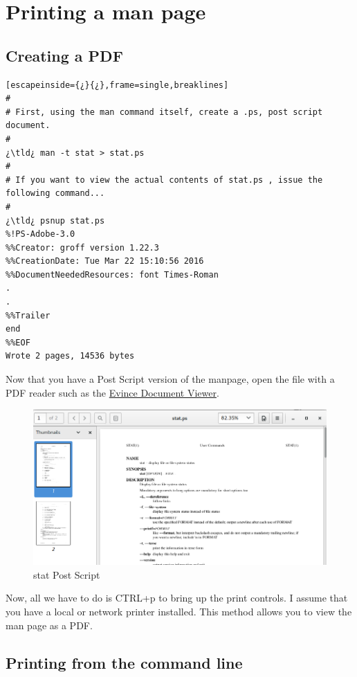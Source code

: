 \section{Printing a man page}

\subsection{Creating a PDF}

\begin{lstlisting}[escapeinside={¿}{¿},frame=single,breaklines]
#
# First, using the man command itself, create a .ps, post script document.
#
¿\tld¿ man -t stat > stat.ps
#
# If you want to view the actual contents of stat.ps , issue the following command...
#
¿\tld¿ psnup stat.ps
%!PS-Adobe-3.0
%%Creator: groff version 1.22.3
%%CreationDate: Tue Mar 22 15:10:56 2016
%%DocumentNeededResources: font Times-Roman
.
.
%%Trailer
end
%%EOF
Wrote 2 pages, 14536 bytes
\end{lstlisting}

Now that you have a Post Script version of the manpage, open the file with a PDF reader such as the \href{https://help.gnome.org/users/evince/stable/}{Evince Document Viewer}.

\begin{figure}[H]
\centering
\includegraphics[width=12cm]{figures/statps}
\caption{stat Post Script}
\label{statPS}
\end{figure}

Now, all we have to do is CTRL+p to bring up the print controls. I assume that you have a local or network printer installed. This method allows you to view the man page as a PDF.\\

\subsection{Printing from the command line}


